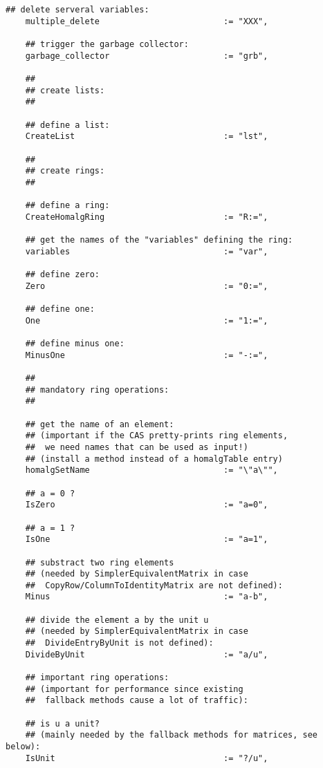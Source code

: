 \documentclass[a4paper,11pt]{report}
\begin{document}
{{{\begin{Verbatim}[fontsize=\small,frame=single,label=Code]
    ## delete serveral variables:
    multiple_delete                         := "XXX",
    
    ## trigger the garbage collector:
    garbage_collector                       := "grb",
    
    ##
    ## create lists:
    ##
    
    ## define a list:
    CreateList                              := "lst",
    
    ##
    ## create rings:
    ##
    
    ## define a ring:
    CreateHomalgRing                        := "R:=",
    
    ## get the names of the "variables" defining the ring:
    variables                               := "var",
    
    ## define zero:
    Zero                                    := "0:=",
    
    ## define one:
    One                                     := "1:=",
    
    ## define minus one:
    MinusOne                                := "-:=",
    
    ##
    ## mandatory ring operations:
    ##
    
    ## get the name of an element:
    ## (important if the CAS pretty-prints ring elements,
    ##  we need names that can be used as input!)
    ## (install a method instead of a homalgTable entry)
    homalgSetName                           := "\"a\"",
    
    ## a = 0 ?
    IsZero                                  := "a=0",
    
    ## a = 1 ?
    IsOne                                   := "a=1",
    
    ## substract two ring elements
    ## (needed by SimplerEquivalentMatrix in case
    ##  CopyRow/ColumnToIdentityMatrix are not defined):
    Minus                                   := "a-b",
    
    ## divide the element a by the unit u
    ## (needed by SimplerEquivalentMatrix in case
    ##  DivideEntryByUnit is not defined):
    DivideByUnit                            := "a/u",
    
    ## important ring operations:
    ## (important for performance since existing
    ##  fallback methods cause a lot of traffic):
    
    ## is u a unit?
    ## (mainly needed by the fallback methods for matrices, see below):
    IsUnit                                  := "?/u",
    

\end{Verbatim}}}}
\end{document}
